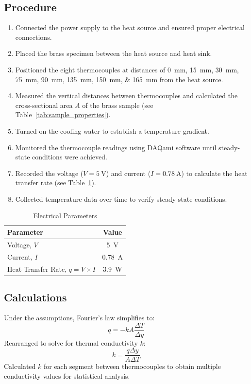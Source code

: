\documentclass[12pt]{article}
\begin{document}
\subsection{Procedure}

\begin{enumerate}
    \item Connected the power supply to the heat source and ensured proper electrical connections.
    \item Placed the brass specimen between the heat source and heat sink.
    \item Positioned the eight thermocouples at distances of \SIlist{0;15;30;75;90;135;150;165}{\milli\meter} from the heat source.
    \item Measured the vertical distances between thermocouples and calculated the cross-sectional area $A$ of the brass sample (see Table~\ref{tab:sample_properties}).
    \item Turned on the cooling water to establish a temperature gradient.
    \item Monitored the thermocouple readings using DAQami software until steady-state conditions were achieved.
    \item Recorded the voltage ($V = \SI{5}{\volt}$) and current ($I = \SI{0.78}{\ampere}$) to calculate the heat transfer rate (see Table~\ref{tab:electrical_parameters}).
    \item Collected temperature data over time to verify steady-state conditions.
\end{enumerate}

\begin{table}[H]
    \centering
    \caption{Electrical Parameters}
    \label{tab:electrical_parameters}
    \begin{tabular}{lc}
        \toprule
        Parameter & Value \\
        \midrule
        Voltage, $V$ & \SI{5}{\volt} \\
        Current, $I$ & \SI{0.78}{\ampere} \\
        Heat Transfer Rate, $q = V \times I$ & \SI{3.9}{\watt} \\
        \bottomrule
    \end{tabular}
\end{table}

\subsection{Calculations}

Under the assumptions, Fourier's law simplifies to:
\begin{equation}
    q = -kA \frac{\Delta T}{\Delta y}
\end{equation}
Rearranged to solve for thermal conductivity $k$:
\begin{equation}
    k = \frac{q \Delta y}{A \Delta T}
\end{equation}
Calculated $k$ for each segment between thermocouples to obtain multiple conductivity values for statistical analysis.
\end{document}
